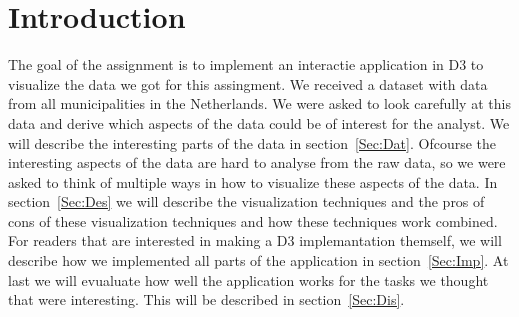 \section{Introduction}
The goal of the assignment is to implement an interactie application in D3 to visualize the data we got for this assingment. We received a dataset with data from all municipalities in the Netherlands.  We were asked to look carefully at this data and derive which aspects of the data could be of interest for the analyst. We will describe the interesting parts of the data in section~\ref{Sec:Dat}. Ofcourse the interesting aspects of the data are hard to analyse from the raw data, so we were asked to think of multiple ways in how to visualize these aspects of the data. In section~\ref{Sec:Des} we will describe the visualization techniques and the pros of cons of these visualization techniques and how these techniques work combined. For readers that are interested in making a D3 implemantation themself, we will describe how we implemented all parts of the application in section~\ref{Sec:Imp}. At last we will evualuate how well the application works for the tasks we thought that were interesting. This will be described in section~\ref{Sec:Dis}.